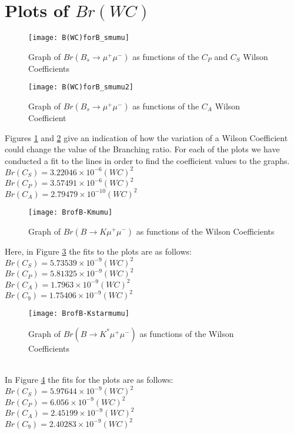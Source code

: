 \documentclass[12pt]{article}
\begin{document}
\section{Plots of $Br(WC)$}
\begin{figure}[h]
\centering
\texttt{[image: B(WC)forB\_smumu]}
\caption{Graph of $Br(B_s\rightarrow \mu^+\mu^-)$ as functions of the $C_P$ and $C_S$ Wilson Coefficients}
\label{fig:Bsmumu1}
\end{figure}
\begin{figure}[h]
\centering
\texttt{[image: B(WC)forB\_smumu2]}
\caption{Graph of $Br(B_s\rightarrow \mu^+\mu^-)$ as functions of the $C_A$ Wilson Coefficient}
\label{fig:Bsmumu2}
\end{figure}
Figures \ref{fig:Bsmumu1} and \ref{fig:Bsmumu2} give an indication of how the variation of a Wilson Coefficient could change the value of the Branching ratio.
For each of the plots we have conducted a fit to the lines in order to find the coefficient values to the graphs. \\
$Br(C_S)=3.22046\times10^{-6} (WC)^2$\\
$Br(C_P)=3.57491\times10^{-6} (WC)^2$\\
$Br(C_A)=2.79479\times10^{-10} (WC)^2$\\
\begin{figure}[h]
\centering
\texttt{[image: BrofB-Kmumu]}
\caption{Graph of $Br(B\rightarrow K\mu^+\mu^-)$ as functions of the Wilson Coefficients}
\label{fig:Bkmumu}
\end{figure}
Here, in Figure \ref{fig:Bkmumu} the fits to the plots are as follows:\\
$Br(C_S)=5.73539\times10^{-9} (WC)^2$\\
$Br(C_P)=5.81325\times10^{-9} (WC)^2$\\
$Br(C_A)=1.7963\times10^{-9} (WC)^2$\\
$Br(C_9)=1.75406\times10^{-9} (WC)^2$\\
\begin{figure}[h]
\centering
\texttt{[image: BrofB-Kstarmumu]}
\caption{Graph of $Br(B\rightarrow K^*\mu^+\mu^-)$ as functions of the Wilson Coefficients}
\label{fig:bKstarmumu}
\end{figure}\\
In Figure \ref{fig:bKstarmumu} the fits for the plots are as follows:\\
$Br(C_S)=5.97644\times10^{-9}(WC)^2$\\
$Br(C_P)=6.056\times10^{-9}(WC)^2$\\
$Br(C_A)=2.45199\times10^{-9} (WC)^2$\\
$Br(C_9)=2.40283\times10^{-9} (WC)^2$\\
\end{document}
